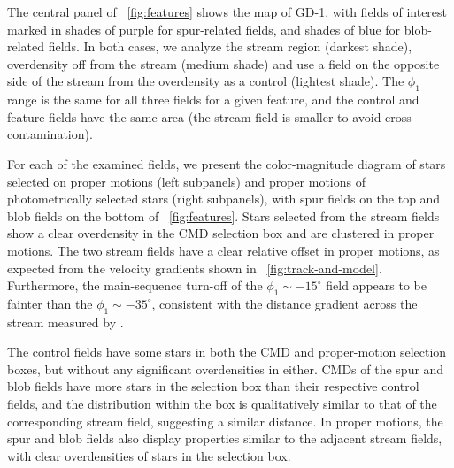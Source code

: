 \documentclass[modern]{aastex62}
\begin{document}
The central panel of \figurename~\ref{fig:features} shows the map of GD-1, with fields of interest marked in shades of purple for spur-related fields, and shades of blue for blob-related fields.
In both cases, we analyze the stream region (darkest shade), overdensity off from the stream (medium shade) and use a field on the opposite side of the stream from the overdensity as a control (lightest shade).
The $\phi_1$ range is the same for all three fields for a given feature, and the control and feature fields have the same area (the stream field is smaller to avoid cross-contamination).

For each of the examined fields, we present the color-magnitude diagram of stars selected on proper motions (left subpanels) and proper motions of photometrically selected stars (right subpanels), with spur fields on the top and blob fields on the bottom of \figurename~\ref{fig:features}.
Stars selected from the stream fields show a clear overdensity in the CMD selection box and are clustered in proper motions.
The two stream fields have a clear relative offset in proper motions, as expected from the velocity gradients shown in \figurename~\ref{fig:track-and-model}.
Furthermore, the main-sequence turn-off of the $\phi_1\sim-15^\circ$ field appears to be fainter than the $\phi_1\sim-35^\circ$, consistent with the distance gradient across the stream measured by \citet{Koposov:2010}.

The control fields have some stars in both the CMD and proper-motion selection boxes, but without any significant overdensities in either.
CMDs of the spur and blob fields have more stars in the selection box than their respective control fields, and the distribution within the box is qualitatively similar to that of the corresponding stream field, suggesting a similar distance.
In proper motions, the spur and blob fields also display properties similar to the adjacent stream fields, with clear overdensities of stars in the selection box.
\end{document}
